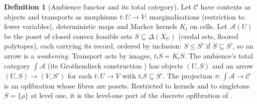 \documentclass[11pt]{article}
\theoremstyle{definition}
\newtheorem{definition}[theorem]{Definition}
\theoremstyle{remark}
\begin{document}
\begin{definition}[Ambience functor and its total category]\label{def:ambience}
Let $\mathcal C$ have contexts as objects and transports as morphisms $t:U\to V$: marginalisations (restriction to fewer
variables), deterministic maps and Markov kernels $K_t$ on cells. Let $\mathcal A(U)$ be the poset of closed convex feasible sets
$S\subseteq\Delta(X_U)$ (credal sets, floored polytopes), each carrying its record, ordered by inclusion: $S\le S'$ if $S\subseteq S'$,
so an arrow is a \emph{weakening}. Transport acts by images, $t_!S=K_tS$. The ambience's total category $\int\!\mathcal A$ (its
Grothendieck construction \cite{MacLaneMoerdijk1992,Johnstone2002}) has objects $(U,S)$ and an arrow $(U,S)\to(V,S')$ for each
$t:U\to V$ with $t_!S\subseteq S'$. The projection $\pi:\int\!\mathcal A\to\mathcal C$ is an opfibration whose fibres are posets.
Restricted to kernels and to singletons $S=\{\rho\}$ at level one, it is the level-one part of the discrete opfibration of
\cite[Prop.~3.3]{Conditionals}.
\end{definition}
\end{document}
